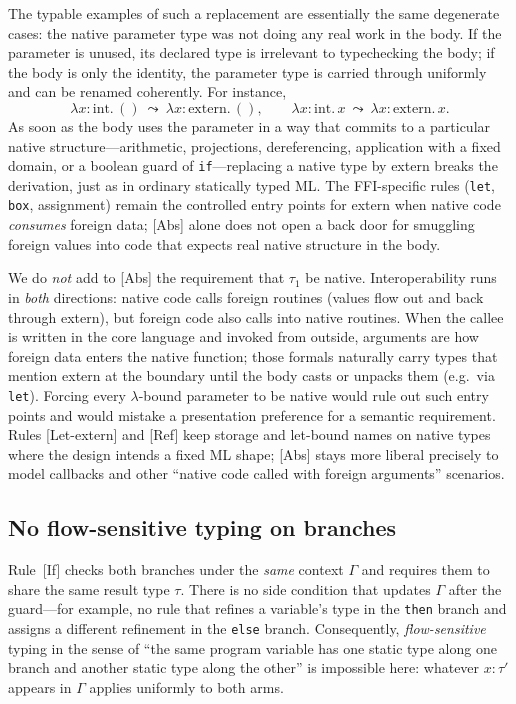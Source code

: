 \documentclass[11pt,a4paper]{article}
\begin{document}
The typable examples of such a replacement are essentially the same degenerate cases: the native parameter type was not doing any real work in the body.
If the parameter is unused, its declared type is irrelevant to typechecking the body; if the body is only the identity, the parameter type is carried through uniformly and can be renamed coherently.
For instance,
\[
  \lambda x{:}\text{int}.\, () \ \leadsto\ \lambda x{:}\text{extern}.\, (),
  \qquad
  \lambda x{:}\text{int}.\, x \ \leadsto\ \lambda x{:}\text{extern}.\, x .
\]
As soon as the body uses the parameter in a way that commits to a particular native structure---arithmetic, projections, dereferencing, application with a fixed domain, or a boolean guard of \texttt{if}---replacing a native type by \textsf{extern} breaks the derivation, just as in ordinary statically typed ML.
The FFI-specific rules (\texttt{let}, \texttt{box}, assignment) remain the controlled entry points for \textsf{extern} when native code \emph{consumes} foreign data; \textsf{[Abs]} alone does not open a back door for smuggling foreign values into code that expects real native structure in the body.

We do \emph{not} add to \textsf{[Abs]} the requirement that $\tau_1$ be native.
Interoperability runs in \emph{both} directions: native code calls foreign routines (values flow out and back through \textsf{extern}), but foreign code also calls into native routines.
When the callee is written in the core language and invoked from outside, arguments are how foreign data enters the native function; those formals naturally carry types that mention \textsf{extern} at the boundary until the body casts or unpacks them (e.g.\ via \texttt{let}).
Forcing every $\lambda$-bound parameter to be native would rule out such entry points and would mistake a presentation preference for a semantic requirement.
Rules \textsf{[{Let-extern}]} and \textsf{[Ref]} keep storage and let-bound names on native types where the design intends a fixed ML shape; \textsf{[Abs]} stays more liberal precisely to model callbacks and other ``native code called with foreign arguments'' scenarios.

\subsection{No flow-sensitive typing on branches}

Rule~\textsf{[If]} checks both branches under the \emph{same} context $\Gamma$ and requires them to share the same result type $\tau$.
There is no side condition that updates $\Gamma$ after the guard---for example, no rule that refines a variable's type in the \texttt{then} branch and assigns a different refinement in the \texttt{else} branch.
Consequently, \emph{flow-sensitive} typing in the sense of ``the same program variable has one static type along one branch and another static type along the other'' is impossible here: whatever $x : \tau'$ appears in $\Gamma$ applies uniformly to both arms.
\end{document}
